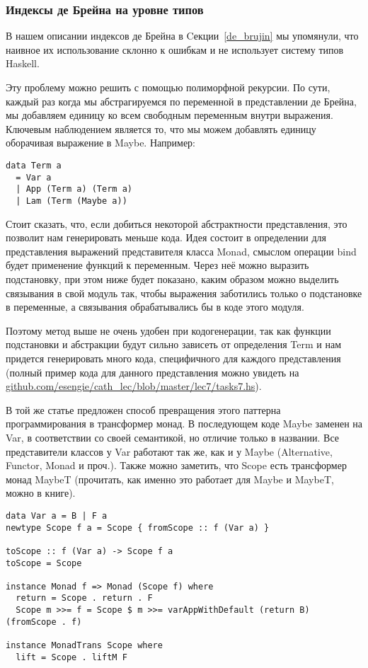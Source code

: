 \subsubsection{Индексы де Брейна на уровне типов}\label{de_brujin_impl}
В нашем описании индексов де Брейна в Cекции~\ref{de_brujin} мы упомянули, что наивное их использование склонно к ошибкам и не использует систему типов Haskell.

Эту проблему можно решить с помощью полиморфной рекурсии\cite{Bird:Pat}. По сути, каждый раз когда мы абстрагируемся по переменной в представлении де Брейна, мы добавляем единицу ко всем свободным переменным внутри выражения. Ключевым наблюдением является то, что мы можем добавлять единицу оборачивая выражение в Maybe. Например:

\begin{lstlisting}[frame=single]
data Term a
  = Var a
  | App (Term a) (Term a)
  | Lam (Term (Maybe a))
\end{lstlisting}

Стоит сказать, что, если добиться некоторой абстрактности представления, это позволит нам генерировать меньше кода. Идея состоит в определении для представления выражений представителя класса Monad, смыслом операции bind будет применение функций к переменным. Через неё можно выразить подстановку, при этом ниже будет показано, каким образом можно выделить связывания в свой модуль так, чтобы выражения заботились только о подстановке в переменные, а связывания обрабатывались бы в коде этого модуля.

Поэтому метод выше не очень удобен при кодогенерации, так как функции подстановки и абстракции будут сильно зависеть от определения Term и нам придется генерировать много кода, специфичного для каждого представления (полный пример кода для данного представления можно увидеть на \url{github.com/esengie/cath_lec/blob/master/lec7/tasks7.hs}).

В той же статье предложен способ превращения этого паттерна программирования в трансформер монад. В последующем коде Maybe заменен на Var, в соответствии со своей семантикой, но отличие только в названии. Все представители классов у Var работают так же, как и у Maybe (Alternative, Functor, Monad и проч.). Также можно заметить, что Scope есть трансформер монад MaybeT (прочитать, как именно это работает для Maybe и MaybeT, можно в книге\cite{moronuki}).

\begin{lstlisting}[frame=single]
data Var a = B | F a
newtype Scope f a = Scope { fromScope :: f (Var a) }

toScope :: f (Var a) -> Scope f a
toScope = Scope

instance Monad f => Monad (Scope f) where
  return = Scope . return . F
  Scope m >>= f = Scope $ m >>= varAppWithDefault (return B) (fromScope . f)

instance MonadTrans Scope where
  lift = Scope . liftM F
\end{lstlisting}


